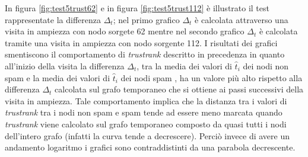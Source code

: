 In figura \ref{fig:test5trust62} e in figura \ref{fig:test5trust112} è illustrato il test rappresentate la differenza \(\Delta_t\); nel primo grafico \(\Delta_t\) è calcolata attraverso una visita in ampiezza con nodo sorgete 62 mentre nel secondo grafico \(\Delta_t\) è calcolata tramite una visita in ampiezza con nodo sorgente 112. I risultati dei grafici smentiscono il comportamento di \textit{trustrank} descritto in precedenza in quanto all'inizio della visita la differenza \(\Delta_t\), tra la media dei valori di  \(\hat{t}_i\) dei nodi non spam e la media dei valori di \(\hat{t}_i\)  dei  nodi spam , ha un valore più alto rispetto alla differenza \(\Delta_t\) calcolata sul grafo temporaneo che si ottiene ai passi successivi della visita in ampiezza. Tale comportamento implica che la distanza tra i valori di \textit{trustrank} tra i nodi non spam e spam tende ad essere meno marcata quando \textit{trustrank} viene calcolato sul grafo temporaneo composto da quasi tutti i nodi dell'intero grafo (infatti la 
curva 
tende a 
decrescere). Perciò invece di avere un andamento logaritmo i grafici sono contraddistinti da una parabola decrescente.

